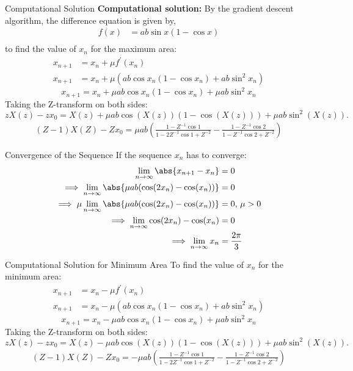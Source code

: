 \documentclass{beamer}
\begin{document}
	\begin{frame}{Computational Solution}
		\textbf{Computational solution:}
		\newline
		By the gradient descent algorithm, the difference equation is given by,
		\begin{align}
			f(x) &= ab \sin{x} (1 - \cos{x}) \\
		\end{align}
		to find the value of $x_n$ for the maximum area:
		\begin{align}
			x_{n + 1} &= x_n + \mu f^{\prime}\left(x_{n}\right) \\
			x_{n + 1} &= x_n + \mu \left(ab \cos{x_{n}} (1 - \cos{x_{n}}) + ab \sin^2{x_{n}}\right)
		\end{align}
		\[
		x_{n+1} = x_n + \mu ab \cos x_n (1 - \cos x_n) + \mu ab \sin^2 x_n
		\]
		Taking the Z-transform on both sides:
		\[
		zX(z) - zx_0 = X(z) + \mu ab \cos(X(z))(1 - \cos(X(z))) + \mu ab \sin^2(X(z)).
		\]
		\begin{align}
			(Z-1)X(Z)-Zx_{0}={\mu}ab\left(\frac{1-Z^{-1}\cos{1}}{1-2Z^{-1}\cos{1}+Z^{-2}}-\frac{1-Z^{-1}\cos{2}}{1-Z^{-1}\cos{2}+Z^{-2}}\right)
		\end{align}
	\end{frame}
	\begin{frame}{Convergence of the Sequence}
		If the sequence $x_n$ has to converge:
		\begin{align}
			\lim_{n\to\infty} \abs{x_{n + 1} - x_n} &= 0 \\
			\implies \lim_{n\to\infty} \abs{{\mu}ab(\cos(2x_{n})-\cos(x_{n}))} &= 0 \\
			\implies \mu \lim_{n\to\infty} \abs{{\mu}ab(\cos(2x_{n})-\cos(x_{n}))} &= 0 \text{, } \mu > 0 \\
			\implies \lim_{n\to\infty} \cos(2x_{n})-\cos(x_{n}) &= 0 \\
			\implies \lim_{n\to\infty} x_{n} &= \frac{2\pi}{3}
		\end{align}
	\end{frame}
	\begin{frame}{Computational Solution for Minimum Area}
		To find the value of $x_n$ for the minimum area:
		\begin{align}
			x_{n + 1} &= x_n - \mu f^{\prime}(x_{n}) \\
			x_{n + 1} &= x_n - \mu \left( ab \cos{x_{n}} (1 - \cos{x_{n}}) + ab \sin^2{x_{n}} \right)
		\end{align}
		\[
		x_{n+1} = x_n - \mu ab \cos x_n (1 - \cos x_n) + \mu ab \sin^2 x_n
		\]
		Taking the Z-transform on both sides:
		\[
		zX(z) - zx_0 = X(z) - \mu ab \cos(X(z))(1 - \cos(X(z))) + \mu ab \sin^2(X(z)).
		\]
		\begin{align}
			(Z-1)X(Z) - Zx_{0} = -{\mu}ab\left(\frac{1-Z^{-1}\cos{1}}{1-2Z^{-1}\cos{1}+Z^{-2}} - \frac{1-Z^{-1}\cos{2}}{1-Z^{-1}\cos{2}+Z^{-2}} \right)
		\end{align}
	\end{frame}
\end{document}
